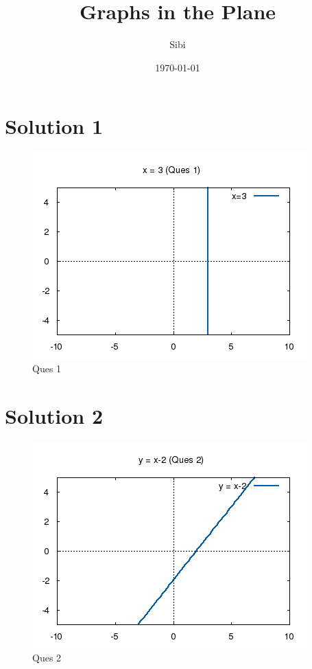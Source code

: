 \documentclass{article}
\begin{document}
\title{Graphs in the Plane}
\author{Sibi}
\date{\today}
\maketitle

\DeclarePairedDelimiter\abs{\lvert}{\rvert}%
\DeclarePairedDelimiter\norm{\lVert}{\rVert}%

\makeatletter
\let\oldabs\abs
\def\abs{\@ifstar{\oldabs}{\oldabs*}}
% 
\let\oldnorm\norm
\def\norm{\@ifstar{\oldnorm}{\oldnorm*}}
\makeatother
\newpage

\section{Solution 1}

\begin{figure}[!htb]
\centering
\includegraphics{./plots/one.png}
\caption{Ques 1}
\end{figure}

\section {Solution 2}

\begin{figure}[!htb]
\centering
\includegraphics{./plots/two.png}
\caption{Ques 2}
\end{figure}
\end{document}
